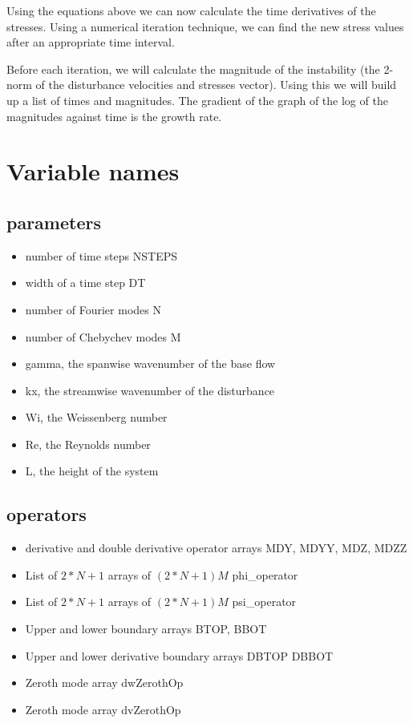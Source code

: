 \documentclass[12pt,a4paper]{article}
\begin{document}
Using the equations above we can now calculate the time derivatives of the stresses. Using a numerical iteration technique, we can find the new stress values after an appropriate time interval. 

Before each iteration, we will calculate the magnitude of the instability (the 2-norm of the disturbance velocities and stresses vector). Using this we will build up a list of times and magnitudes. The gradient of the graph of the log of the magnitudes against time is the growth rate. 

\section{Variable names}

\subsection{parameters}

\begin{itemize}
    \item number of time steps NSTEPS
    \item width of a time step DT
    \item number of Fourier modes N
    \item number of Chebychev modes M
    \item gamma, the spanwise wavenumber of the base flow
    \item kx, the streamwise wavenumber of the disturbance
    \item Wi, the Weissenberg number 
    \item Re, the Reynolds number
    \item L, the height of the system
\end{itemize}

\subsection{operators}

\begin{itemize}
    \item derivative and double derivative operator arrays MDY, MDYY, MDZ, MDZZ 
    \item List of $2*N+1$ arrays of $(2*N+1)M$ phi\_operator
    \item List of $2*N+1$ arrays of $(2*N+1)M$ psi\_operator
    \item Upper and lower boundary arrays BTOP, BBOT
    \item Upper and lower derivative boundary arrays DBTOP DBBOT
    \item Zeroth mode array dwZerothOp
    \item Zeroth mode array dvZerothOp
\end{itemize}
\end{document}
